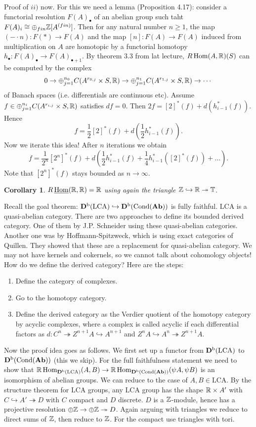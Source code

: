 \documentclass[A4paper, british, reqno]{amsart}
\theoremstyle{darkgreentheorem}
\newtheorem{cor}[thm]{Corollary}
\theoremstyle{darkbluedefinition}
\theoremstyle{darkredexample}
\theoremstyle{remark}
\DeclareMathOperator{\Hom}{Hom}
\DeclareMathOperator{\Cond}{Cond}
\DeclareMathOperator{\ihom}{\underline{Hom}}
\newcommand{\1}{\mathbbm{1}}
\newcommand{\op}{\oplus}
\newcommand{\tms}{\times}
\newcommand{\epi}{\twoheadrightarrow}
\newcommand{\mono}{\hookrightarrow}
\newcommand{\LCA}{\mathrm{LCA}}
\begin{document}
Proof of $ii)$ now.
For this we need a lemma (Proposition 4.17): consider a functorial resolution $F(A)_{\bullet}$ of an abelian group such taht $F(A)_{i}\cong \op_{fin}\Z[A^{(fin)}]$.
Then for any natural number $n\geqslant 1$, the map $(-\cdot n)\colon F(*)\to F(A)$ and the map $[n]\colon F(A)\to F(A)$ induced from multiplication on $A$ are homotopic by a functorial homotopy $h_{\bullet}\colon F(A)_{\bullet}\to F(A)_{\bullet +1}$.
By theorem 3.3 from lat lecture, $R\Hom(A,\R)(S)$ can be computed by the complex
\[ 0\to \op_{j=1}^{n_{0}}C(A^{r_{0,j}}\tms S,\R)\to \op_{j=1}^{n_{1}}C(A^{r_{1,j}}\tms S,\R)\to \cdots \]
of Banach spaces (i.e. differentials are continuous etc).
Assume $f\in \op_{j=1}^{n_{i}}C(A^{r_{i,j}}\tms S,\R)$ satisfies $df=0$.
Then $2f=[2]^{*}(f)+d(h_{i-1}^{*}(f))$.
Hence
\[ f=\frac{1}{2}[2]^{*}(f)+d(\frac{1}{2}h_{i-1}^{*}(f)).\]
Now we iterate this idea!
After $n$ iterations we obtain
\[ f=\frac{1}{2^{n}}[2^{n}]^{*}(f)+d(\frac{1}{2}h_{i-1}^{*}(f)+\frac{1}{4}h_{i-1}^{*}([2]^{*}(f))+\ldots ). \]
Note that $[2^{n}]^{*}(f)$ stays bounded as $n\to \infty$.

\begin{cor}
    $R\ihom(\R,\R)=\R$ using again the triangle $\Z\mono\R\epi\bbT$.
\end{cor}

Recall the goal theorem: $\Db(\LCA)\mono \Db(\Cond(\Ab))$ is fully faithful.
$\LCA$ is a quasi-abelian category.
There are two approaches to define its bounded derived category.
One of them by J.P. Schneider using these quasi-abelian categories.
Another one was by Hoffmann-Spitzweck, which is using exact categories of Quillen.
They showed that these are a replacement for quasi-abelian category.
We may not have kernels and cokernels, so we cannot talk about cohomology objects!
How do we define the derived category?
Here are the steps:

\begin{enumerate}
    \item Define the category of complexes.
    \item Go to the homotopy category.
    \item Define the derived category as the Verdier quotient of the homotopy category by acyclic complexes, where a complex is called acyclic if each differential factors as $d\colon C^{n}\epi Z^{n+1}A\mono A^{n+1}$ and $Z^{n}A\mono A^{n}\epi Z^{n+1}A$.
\end{enumerate}

Now the proof idea goes as follows.
We first set up a functor from $\Db(\LCA)$ to $\Db(\Cond(\Ab))$ (this we skip).
For the full faithfulness statement we need to show that $\R\Hom_{\Db(\LCA)}(A,B)\to \R\Hom_{\Db(\Cond(\Ab))}(\psi A,\psi B)$ is an isomorphism of abelian groups.
We can reduce to the case of $A,B\in \LCA$.
By the structure theorem for $\LCA$ groups, any $\LCA$ group has the shape $\R\tms A'$ with $C\mono A'\epi D$ with $C$ compact and $D$ discrete.
$D$ is a $\mathbb{Z}$-module, hence has a projective resolution $\op \Z\to \op \Z\epi D$.
Again arguing with triangles we reduce to direct sums of $\mathbb{Z}$, then reduce to $\mathbb{Z}$.
For the compact use triangles with tori.
\end{document}
